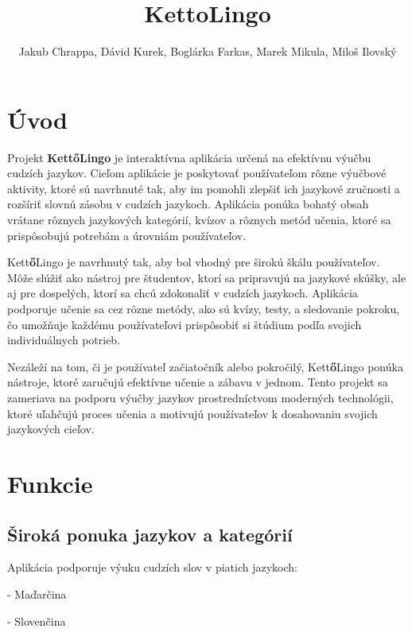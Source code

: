 \documentclass{article}
\title{KettoLingo}
\author{Jakub Chrappa, Dávid Kurek, Boglárka Farkas, Marek Mikula, Miloš Ilovský}
\begin{document}
\maketitle

\newpage
\tableofcontents

\newpage
\section{Úvod}

Projekt \textbf{Kett\textbf{ő}Lingo} je interaktívna aplikácia určená na efektívnu výučbu cudzích jazykov. Cieľom aplikácie je poskytovať používateľom rôzne výučbové aktivity, ktoré sú navrhnuté tak, aby im pomohli zlepšiť ich jazykové zručnosti a rozšíriť slovnú zásobu v cudzích jazykoch. Aplikácia ponúka bohatý obsah vrátane rôznych jazykových kategórií, kvízov a rôznych metód učenia, ktoré sa prispôsobujú potrebám a úrovniám používateľov.

Kett\textbf{ő}Lingo je navrhnutý tak, aby bol vhodný pre širokú škálu používateľov. Môže slúžiť ako nástroj pre študentov, ktorí sa pripravujú na jazykové skúšky, ale aj pre dospelých, ktorí sa chcú zdokonaliť v cudzích jazykoch. Aplikácia podporuje učenie sa cez rôzne metódy, ako sú kvízy, testy, a sledovanie pokroku, čo umožňuje každému používateľovi prispôsobiť si štúdium podľa svojich individuálnych potrieb. 

Nezáleží na tom, či je používateľ začiatočník alebo pokročilý, Kett\textbf{ő}Lingo ponúka nástroje, ktoré zaručujú efektívne učenie a zábavu v jednom. Tento projekt sa zameriava na podporu výučby jazykov prostredníctvom moderných technológii, ktoré uľahčujú proces učenia a motivujú používateľov k dosahovaniu svojich jazykových cieľov.







\newpage
\section{Funkcie}

\subsection{Široká ponuka jazykov a kategórií}

Aplikácia podporuje výuku cudzích slov v piatich jazykoch:

- Maďarčina

- Slovenčina
\end{document}
